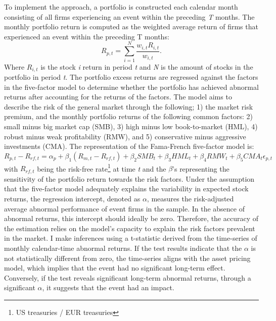 To implement the approach, a portfolio is constructed each calendar month consisting of all firms experiencing an event within the preceding \textit{T} months. The monthly portfolio return is computed as the weighted average return of firms that experienced an event within the preceding T months:
\begin{equation}
    R_{p,t} = \sum_{i=1} ^{N} \frac{w_{i,t} R_{i,t} }{ w_{i,t}  } .
\end{equation}
Where $R_{i,t}$ is the stock \textit{i} return in period \textit{t} and \textit{N} is the amount of stocks in the portfolio in period \textit{t}. 
The portfolio excess returns are regressed against the factors in the \cite{fama2015five} five-factor model to determine whether the portfolio has achieved abnormal returns after accounting for the returns of the factors. The model aims to describe the risk of the general market through the following; 1) the market risk premium, and the monthly portfolio returns of the following common factors: 2) small minus big market cap (SMB), 3) high minus low book-to-market (HML), 4) robust minus weak profitability (RMW), and 5) conservative minus aggressive investments (CMA). The representation of the Fama-French five-factor model is: 
\begin{equation} \label{eq: FF5}
    R_{p,t} - R_{rf,t} = \alpha_p + \beta_1(R_{m,t} - R_{rf,t}) + \beta_2 SMB_t + \beta_3 HML_t + \beta_4 RMW_t + \beta_5 CMA_t \epsilon_{p,t} 
\end{equation}
with $R_{rf,t}$ being the risk-free rate\footnote{US treasuries / EUR treasuries} at time \textit{t} and the $\beta$'s representing the sensitivity of the portfolio return towards the risk factors. Under the assumption that the five-factor model adequately explains the variability in expected stock returns, the regression intercept, denoted as $\alpha$, measures the risk-adjusted average abnormal performance of event firms in the sample. In the absence of abnormal returns, this intercept should ideally be zero. Therefore, the accuracy of the estimation relies on the model's capacity to explain the risk factors prevalent in the market. I make inferences using a t-statistic derived from the time-series of monthly calendar-time abnormal returns. If the test results indicate that the $\alpha$ is not statistically different from zero, the time-series aligns with the asset pricing model, which implies that the event had no significant long-term effect. Conversely, if the test reveals significant long-term abnormal returns, through a significant $\alpha$, it suggests that the event had an impact.

